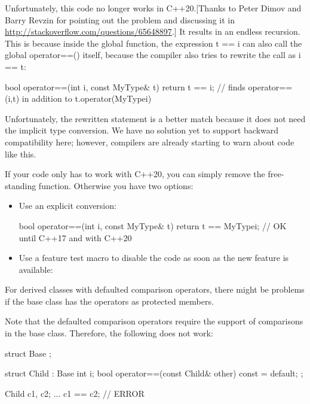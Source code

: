Unfortunately, this code no longer works in C++20.[Thanks to Peter Dimov and Barry Revzin for pointing out the problem and discussing it in \url{http://stackoverflow.com/questions/65648897}.] It results in an endless recursion. This is because inside the global function, the expression t == i can also call the global operator==() itself, because the compiler also tries to rewrite the call as i == t:

\begin{cpp}
bool operator==(int i, const MyType& t) {
	return t == i; // finds operator==(i,t) in addition to t.operator(MyType{i})
}
\end{cpp}

Unfortunately, the rewritten statement is a better match because it does not need the implicit type conversion. We have no solution yet to support backward compatibility here; however, compilers are already starting to warn about code like this.

If your code only has to work with C++20, you can simply remove the free-standing function. Otherwise you have two options:

\begin{itemize}
\item
Use an explicit conversion:

\begin{cpp}
bool operator==(int i, const MyType& t) {
	return t == MyType{i}; // OK until C++17 and with C++20
}
\end{cpp}

\item
Use a feature test macro to disable the code as soon as the new feature is available:
\end{itemize}


For derived classes with defaulted comparison operators, there might be problems if the base class has the operators as protected members.

Note that the defaulted comparison operators require the support of comparisons in the base class. Therefore, the following does not work:

\begin{cpp}
struct Base {
};

struct Child : Base {
	int i;
	bool operator==(const Child& other) const = default;
};

Child c1, c2;
...
c1 == c2; // ERROR
\end{cpp}


